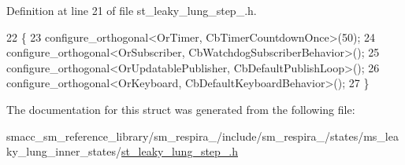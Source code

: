 Definition at line 21 of file st\+\_\+leaky\+\_\+lung\+\_\+step\+\_.\+h.


\begin{DoxyCode}
22     \{
23         configure\_orthogonal<OrTimer, CbTimerCountdownOnce>(50);
24         configure\_orthogonal<OrSubscriber, CbWatchdogSubscriberBehavior>();
25         configure\_orthogonal<OrUpdatablePublisher, CbDefaultPublishLoop>();
26         configure\_orthogonal<OrKeyboard, CbDefaultKeyboardBehavior>();
27     \}
\end{DoxyCode}


The documentation for this struct was generated from the following file\+:\begin{DoxyCompactItemize}
\item 
smacc\+\_\+sm\+\_\+reference\+\_\+library/sm\+\_\+respira\+\_/include/sm\+\_\+respira\+\_/states/ms\+\_\+leaky\+\_\+lung\+\_\+inner\+\_\+states/\hyperlink{st__leaky__lung__step__3_8h}{st\+\_\+leaky\+\_\+lung\+\_\+step\+\_.\+h}\end{DoxyCompactItemize}

